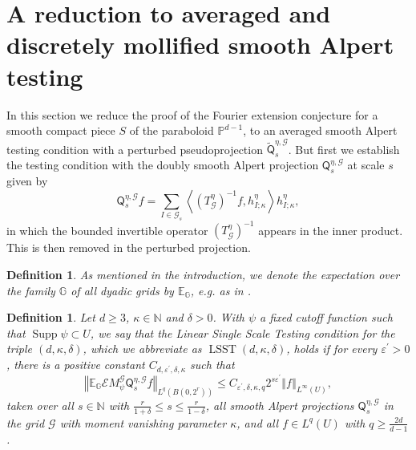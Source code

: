\documentclass{amsart}%
\theoremstyle{plain}
\newtheorem{definition}[theorem]{Definition}
\numberwithin{equation}{section}
\begin{document}
\section{A reduction to averaged and discretely mollified smooth Alpert
testing}

In this section we reduce the proof of the Fourier extension conjecture for a
smooth compact piece $S$ of the paraboloid $\mathbb{P}^{d-1}$, to an averaged
smooth Alpert testing condition with a perturbed pseudoprojection
$\widetilde{\mathsf{Q}}_{s}^{\eta,\mathcal{G}}$. But first we establish the
testing condition with the doubly smooth Alpert projection $\mathsf{Q}%
_{s}^{\eta,\mathcal{G}}$ at scale $s$ given by%
\[
\mathsf{Q}_{s}^{\eta,\mathcal{G}}f=\sum_{I\in\mathcal{G}_{s}}\left\langle
\left(  T_{\mathcal{G}}^{\eta}\right)  ^{-1}f,h_{I;\kappa}^{\eta}\right\rangle
h_{I;\kappa}^{\eta},
\]
in which the bounded invertible operator $\left(  T_{\mathcal{G}}^{\eta
}\right)  ^{-1}$ appears in the inner product. This is then removed in the
perturbed projection.

\begin{definition}
As mentioned in the introduction, we denote the expectation over the family
$\mathbb{G}$ of all dyadic grids by $\mathbb{E}_{\mathbb{G}}$, e.g. as in
\cite{Hyt}.
\end{definition}

\begin{definition}
\label{LSST}Let $d\geq3$, $\kappa\in\mathbb{N}$ and $\delta>0$. With $\psi$ a
fixed cutoff function such that $\operatorname*{Supp}\psi\subset U$, we say
that the \emph{Linear Single Scale Testing condition for the triple }$\left(
d,\kappa,\delta\right)  $, which we abbreviate as $\operatorname*{LSST}\left(
d,\kappa,\delta\right)  $, holds if for every $\varepsilon^{\prime}>0$, there
is a positive constant $C_{d,\varepsilon^{\prime},\delta,\kappa}$ such that%
\begin{equation}
\left\Vert \mathbb{E}_{\mathbb{G}}\mathcal{E}M_{\psi}^{\mathcal{G}}%
\mathsf{Q}_{s}^{\eta,\mathcal{G}}f\right\Vert _{L^{q}\left(  B\left(
0,2^{r}\right)  \right)  }\leq C_{\varepsilon^{\prime},\delta,\kappa
,q}2^{s\varepsilon^{\prime}}\left\Vert f\right\Vert _{L^{\infty}\left(
U\right)  },\label{lin d}%
\end{equation}
taken over all $s\in\mathbb{N}$ with $\frac{r}{1+\delta}\leq s\leq\frac
{r}{1-\delta}$, all smooth Alpert projections $\mathsf{Q}_{s}^{\eta
,\mathcal{G}}$ in the grid $\mathcal{G}$ with moment vanishing parameter
$\kappa$, and all $f\in L^{q}\left(  U\right)  $ with $q\geq\frac{2d}{d-1}$.
\end{definition}
\end{document}

